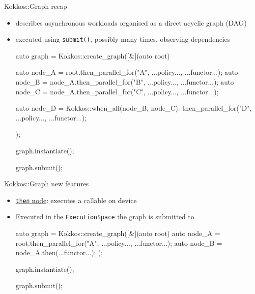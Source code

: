


\begin{frame}[fragile]{Kokkos::Graph recap}
 \begin{itemize}
     \item describes asynchronous workloads organised as a direct acyclic graph (DAG)
     \item executed using \texttt{submit()}, possibly many times, observing dependencies
      \begin{code}[keywords={auto}]
auto graph = Kokkos::create_graph([&](auto root) {
    auto node_A = root.then_parallel_for("A", ...policy..., ...functor...);
    auto node_B = node_A.then_parallel_for("B", ...policy..., ...functor...);
    auto node_C = node_A.then_parallel_for("C", ...policy..., ...functor...);

    auto node_D = Kokkos::when_all(node_B, node_C).
                  then_parallel_for("D", ...policy..., ...functor...);
});

graph.instantiate();

graph.submit();
      \end{code}
 \end{itemize}
\end{frame}

\begin{frame}[fragile]{Kokkos::Graph new features}
 \begin{itemize}
  \item \href{https://github.com/kokkos/kokkos/pull/7629}{\texttt{then} node}: executes a callable on device
   \item Executed in the \texttt{ExecutionSpace} the graph is submitted to
     \begin{code}[keywords={auto}]
auto graph = Kokkos::create_graph([&](auto root) {
    auto node_A = root.then_parallel_for("A", ...policy..., ...functor...);
    auto node_B = node_A.then(...functor...);
});

graph.instantiate();

graph.submit();
     \end{code}
 \end{itemize}
\end{frame}

